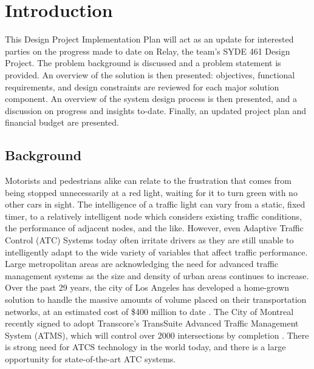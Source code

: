 \documentclass{article}
\begin{document}


\dotableofcontents

\newpage
\doublespacing
{}
\section{Introduction}
\setlength{\parindent}{1cm}

This Design Project Implementation Plan will act as an update for interested parties on the progress made to date on Relay, the team's SYDE 461 Design Project. The problem background is discussed and a problem statement is provided. An overview of the solution is then presented: objectives, functional requirements, and design constraints are reviewed for each major solution component. An overview of the system design process is then presented, and a discussion on progress and insights to-date. Finally, an updated project plan and financial budget are presented.\\


\subsection{Background}
Motorists and pedestrians alike can relate to the frustration that comes from being stopped unnecessarily at a red light, waiting for it to turn green with no other cars in sight.
The intelligence of a traffic light can vary from a static, fixed timer, to a relatively intelligent node which considers existing traffic conditions, the performance of adjacent nodes, and the like.
However, even Adaptive Traffic Control (ATC) Systems today often irritate drivers as they are still unable to intelligently adapt to the wide variety of variables that affect traffic performance.\\

Large metropolitan areas are acknowledging the need for advanced traffic management systems as the size and density of urban areas continues to increase.
Over the past 29 years, the city of Los Angeles has developed a home-grown solution to handle the massive amounts of volume placed on their transportation networks, at an estimated cost of \$400 million to date \cite{la-atcs-article}.
The City of Montreal recently signed to adopt Transcore's TransSuite Advanced Traffic Management System (ATMS), which will control over 2000 intersections by completion \cite{montreal-transcore}.
There is strong need for ATCS technology in the world today, and there is a large opportunity for state-of-the-art ATC systems.\\
\end{document}
